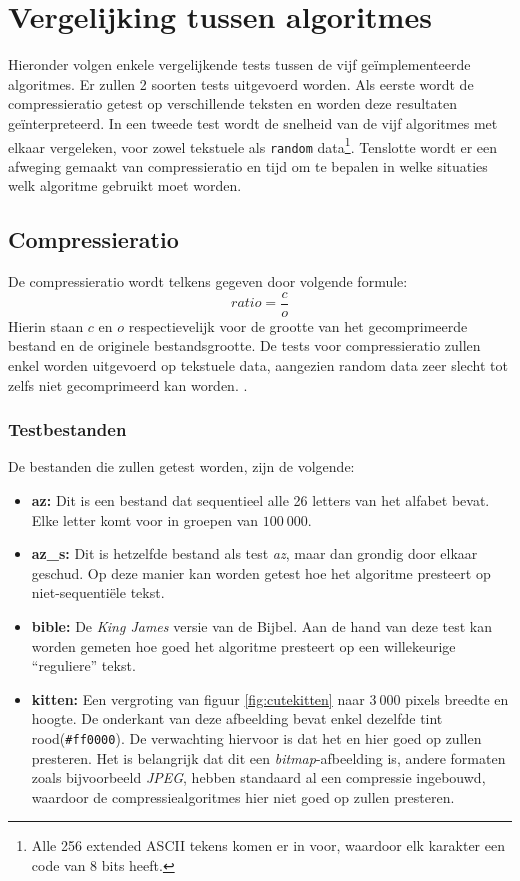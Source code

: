 \chapter{Vergelijking tussen algoritmes}
Hieronder volgen enkele vergelijkende tests tussen de vijf ge\"implementeerde algoritmes. Er zullen 2 soorten tests uitgevoerd worden. Als eerste wordt de compressieratio getest op verschillende teksten en worden deze resultaten ge\"interpreteerd. In een tweede test wordt de snelheid van de vijf algoritmes met elkaar vergeleken, voor zowel tekstuele als \texttt{random} data\footnote{Alle 256 extended ASCII tekens komen er in voor, waardoor elk karakter een code van 8 bits heeft.}. Tenslotte wordt er een afweging gemaakt van compressieratio en tijd om te bepalen in welke situaties welk algoritme gebruikt moet worden.

\section{Compressieratio}
De compressieratio wordt telkens gegeven door volgende formule:
$$ratio = \frac{c}{o}$$
Hierin staan $c$ en $o$ respectievelijk voor de grootte van het gecomprimeerde bestand en de originele bestandsgrootte. De tests voor compressieratio zullen enkel worden uitgevoerd op tekstuele data, aangezien random data zeer slecht tot zelfs niet gecomprimeerd kan worden. \cite{ad3cursus}.

\subsection{Testbestanden}
De bestanden die zullen getest worden, zijn de volgende:
\begin{itemize}
	\item \textbf{az: } Dit is een bestand dat sequentieel alle 26 letters van het alfabet bevat. Elke letter komt voor in groepen van $100\ 000$.
	\item \textbf{az\_s:} Dit is hetzelfde bestand als test \emph{az}, maar dan grondig door elkaar geschud. Op deze manier kan worden getest hoe het algoritme presteert op niet-sequenti\"ele tekst.
	\item \textbf{bible:} De \emph{King James} versie van de Bijbel. \cite{gutenbergbible} Aan de hand van deze test kan worden gemeten hoe goed het algoritme presteert op een willekeurige ``reguliere'' tekst.
	\item \textbf{kitten:} Een vergroting van figuur \ref{fig:cutekitten} naar $3\ 000$ pixels breedte en hoogte. De onderkant van deze afbeelding bevat enkel dezelfde tint rood(\texttt{\#ff0000}). De verwachting hiervoor is dat het \huffslid en \huffblock hier goed op zullen presteren. Het is belangrijk dat dit een \emph{bitmap}-afbeelding is, andere formaten zoals bijvoorbeeld \emph{JPEG}, hebben standaard al een compressie ingebouwd, waardoor de compressiealgoritmes hier niet goed op zullen presteren.
\end{itemize}

